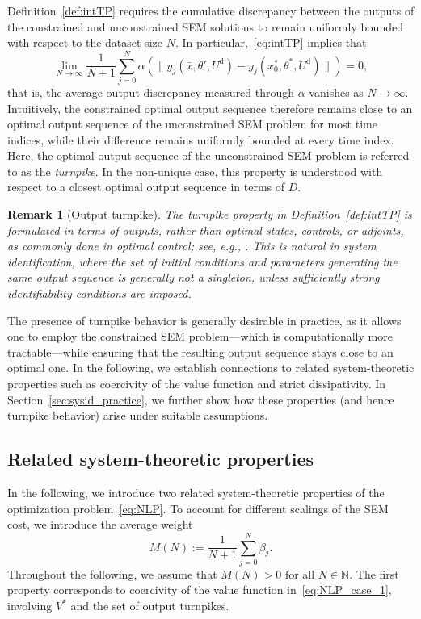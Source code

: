 \documentclass[a4paper,fleqn]{cas-dc}
\newtheorem{rem}{Remark}
\begin{document}
Definition~\ref{def:intTP} requires the cumulative discrepancy between the outputs of the constrained and unconstrained SEM solutions to remain uniformly bounded with respect to the dataset size $N$.
In particular,~\eqref{eq:intTP} implies that
\begin{equation*}
	\lim_{N \to \infty}
	\frac{1}{N+1}\sum_{j=0}^{N}
	\alpha\left(
	\|y_j(\bar{x},\theta',U^{\mathrm d})
	-y_j(x_0^*,\theta^*,U^{\mathrm d})\|
	\right)
	=0,
\end{equation*}
that is, the average output discrepancy measured through $\alpha$ vanishes as $N\to\infty$. Intuitively, the constrained optimal output sequence therefore remains close to an optimal output sequence of the unconstrained SEM problem for most time indices, while their difference remains uniformly bounded at every time index. Here, the optimal output sequence of the unconstrained SEM problem is referred to as the \emph{turnpike}. In the non-unique case, this property is understood with respect to a closest optimal output sequence in terms of $D$.

\begin{rem}[Output turnpike]
	The turnpike property in Definition~\ref{def:intTP} is formulated in terms of outputs, rather than optimal states, controls, or adjoints, as commonly done in optimal control; see, e.g., \cite{Trelat2025,Faulwasser2022,Zaslavski2006}.
	This is natural in system identification, where the set of initial conditions and parameters generating the same output sequence is generally \emph{not} a singleton, unless sufficiently strong identifiability conditions are imposed.
\end{rem}

The presence of turnpike behavior is generally desirable in practice, as it allows one to employ the constrained SEM problem---which is computationally more tractable---while ensuring that the resulting output sequence stays close to an optimal one.
In the following, we establish connections to related system-theoretic properties such as coercivity of the value function and strict dissipativity. In Section~\ref{sec:sysid_practice}, we further show how these properties (and hence turnpike behavior) arise under suitable assumptions.

\subsection{Related system-theoretic properties}\label{sec:properties}

In the following, we introduce two related system-theoretic properties of the optimization problem~\eqref{eq:NLP}. To account for different scalings of the SEM cost, we introduce the average weight
\begin{equation}\label{eq:B_def}
	M(N):=\frac{1}{N+1}\sum_{j=0}^N\beta_j.
\end{equation}
Throughout the following, we assume that $M(N)>0$ for all $N\in\mathbb{N}$.
The first property corresponds to coercivity of the value function in~\eqref{eq:NLP_case_1}, involving $V^*$ and the set of output turnpikes.
\end{document}
